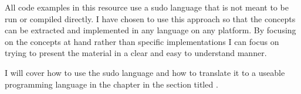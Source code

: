 All code examples in this resource use a sudo language that is not meant to be run or compiled directly.
I have chosen to use this approach so that the concepts can be extracted and implemented in any language
on any platform.
By focusing on the concepts at hand rather than specific implementations I can focus on trying to present
the material in a clear and easy to understand manner.
\par

I will cover how to use the sudo language and how to translate it to a useable programming language
in the chapter  in the section titled .
